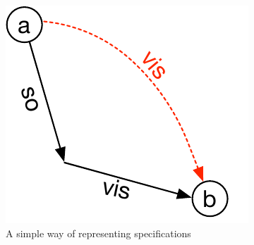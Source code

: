 \begin{figure}[h]
\includegraphics[scale=0.6]{Figures/MR.pdf}
\caption{A simple way of representing specifications}
\end{figure}

